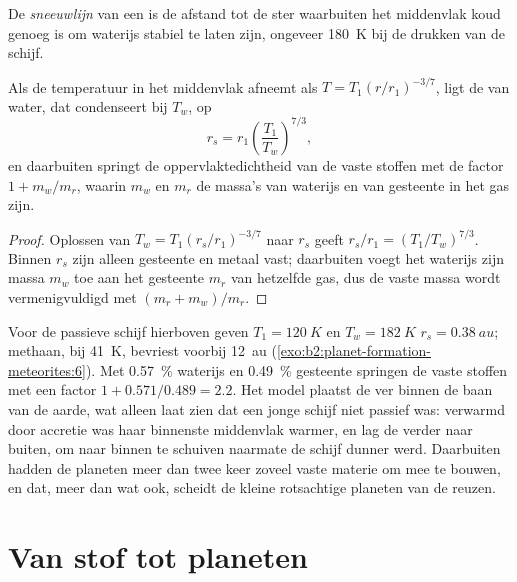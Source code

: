 \begin{definition}[Sneeuwlijn]\label{def:b2:planet-formation-meteorites:snow-line}
De \emph{sneeuwlijn} van een  is de afstand
tot de ster waarbuiten het middenvlak koud genoeg is om waterijs
stabiel te laten zijn, ongeveer \qty{180}{K} bij de drukken van de schijf.
\end{definition}

\begin{proposition}
\label{prop:b2:planet-formation-meteorites:snow-line}
Als de temperatuur in het middenvlak afneemt als $T = T_1 (r/r_1)^{-3/7}$, ligt de  van
water, dat condenseert bij $T_w$, op
\[
  r_s = r_1 \left(\frac{T_1}{T_w}\right)^{7/3},
\]
en daarbuiten springt de oppervlaktedichtheid van de vaste stoffen met de factor $1 + m_w/m_r$,
waarin $m_w$ en $m_r$ de massa's van waterijs en van gesteente in het gas zijn.
\end{proposition}

\begin{proof}
Oplossen van $T_w = T_1 (r_s/r_1)^{-3/7}$ naar $r_s$ geeft
$r_s/r_1 = (T_1/T_w)^{7/3}$. Binnen $r_s$ zijn alleen gesteente en metaal vast; daarbuiten
voegt het waterijs zijn massa $m_w$ toe aan het gesteente $m_r$ van hetzelfde gas, dus de
vaste massa wordt vermenigvuldigd met $(m_r + m_w)/m_r$.
\end{proof}

Voor de passieve schijf hierboven geven $T_1 = \qty{120}{K}$ en $T_w = \qty{182}{K}$
$r_s = \qty{0.38}{au}$; methaan, bij \qty{41}{K}, bevriest voorbij \qty{12}{au}
(\cref{exo:b2:planet-formation-meteorites:6}). Met \qty{0.57}{\percent} waterijs en \qty{0.49}{\percent}
gesteente springen de vaste stoffen met een factor $1 + 0.571/0.489 = 2.2$. Het model
plaatst de  ver binnen de baan van de aarde, wat alleen laat zien dat een
jonge schijf niet passief was: verwarmd door accretie was haar binnenste middenvlak warmer,
en lag de  verder naar buiten, om naar binnen te schuiven naarmate de schijf dunner werd.
Daarbuiten hadden de planeten meer dan twee keer zoveel vaste materie om mee te bouwen, en
dat, meer dan wat ook, scheidt de kleine rotsachtige planeten van de
reuzen.

\section{Van stof tot planeten}

